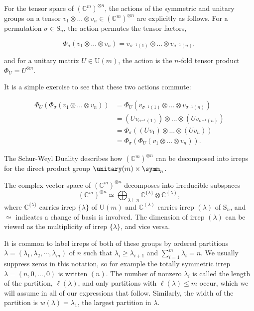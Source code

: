 For the tensor space of $(\mathbb{C}^{m})^{\otimes n}$, the actions of the symmetric and unitary groups on a tensor $v_1\otimes\dots\otimes v_n \in (\mathbb{C}^m)^{\otimes n}$ are explicitly as follows. 
For a permutation $\sigma \in \textrm{S}_n$, the action permutes the tensor factors,

\begin{equation}
\Phi_\sigma(v_1\otimes\dots\otimes v_n) = v_{\sigma^{-1}(1)}\otimes\dots\otimes v_{\sigma^{-1}(n)},
\end{equation}

\noindent and for a unitary matrix $U \in \textrm{U}(m)$, the action is the $n$-fold tensor product $\Phi_U = U^{\otimes n}$.

It is a simple exercise to see that these two actions commute:

\begin{align}
\Phi_U(\Phi_\sigma(v_1\otimes\dots\otimes v_n)) &= \Phi_U(v_{\sigma^{-1}(1)}\otimes\dots\otimes v_{\sigma^{-1}(n)})\\
&= (Uv_{\sigma^{-1}(1)})\otimes\dots\otimes(Uv_{\sigma^{-1}(n)})\\
&= \Phi_\sigma((Uv_1)\otimes\dots\otimes (Uv_n))\\
&= \Phi_\sigma(\Phi_U(v_1\otimes\dots\otimes v_n)).
\end{align}

The Schur-Weyl Duality describes how $(\mathbb{C}^m)^{\otimes n}$ can be decomposed into irreps for the direct product group $\unitary(m)\times\symm_n$.

\begin{theorem}
\label{thm:schur-weyl-duality} The complex vector space of $(\mathbb{C}^m)^{\otimes n}$ decomposes into irreducible subspaces
\begin{equation}
(\mathbb{C}^m)^{\otimes n} \simeq \bigoplus_{\lambda\vdash n} \mathbb{C}^{\{\lambda\}} \otimes \mathbb{C}^{(\lambda)} ,
\end{equation}
where $\mathbb{C}^{\{\lambda\}}$ carries irrep $\{\lambda\}$ of $\textrm{U}(m)$ and $\mathbb{C}^{(\lambda)}$ carries irrep $(\lambda)$ of $\textrm{S}_n$, and $\simeq$ indicates a change of basis is involved.
The dimension of irrep $(\lambda)$ can be viewed as the multiplicity of irrep $\{\lambda\}$, and vice versa.
\end{theorem}

It is common to label irreps of both of these groups by ordered partitions $\lambda = (\lambda_1,\lambda_2,\cdots,\lambda_m)$ of $n$ such that $\lambda_i \geq \lambda_{i+1}$ and $\sum_{i = 1}^m \lambda_i = n$.
We usually suppress zeros in this notation, so for example the totally symmetric irrep $\lambda=(n, 0,\dots,0)$ is written $(n)$. 
The number of nonzero $\lambda_i$ is called the length of the partition, $\ell(\lambda)$, and only partitions with $\ell(\lambda) \leq m$ occur, which we will assume in all of our expressions that follow. Similarly, the width of the partition is $w(\lambda) = \lambda_1$, the largest partition in $\lambda$.


